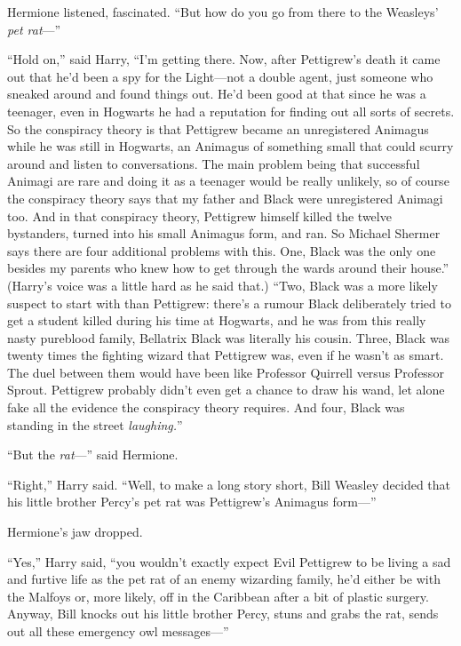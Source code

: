 Hermione listened, fascinated. “But how do you go from there to the Weasleys’ \emph{pet rat}—”

“Hold on,” said Harry, “I’m getting there. Now, after Pettigrew’s death it came out that he’d been a spy for the Light—not a double agent, just someone who sneaked around and found things out. He’d been good at that since he was a teenager, even in Hogwarts he had a reputation for finding out all sorts of secrets. So the conspiracy theory is that Pettigrew became an unregistered Animagus while he was still in Hogwarts, an Animagus of something small that could scurry around and listen to conversations. The main problem being that successful Animagi are rare and doing it as a teenager would be really unlikely, so of course the conspiracy theory says that my father and Black were unregistered Animagi too. And in that conspiracy theory, Pettigrew himself killed the twelve bystanders, turned into his small Animagus form, and ran. So Michael Shermer says there are four additional problems with this. One, Black was the only one besides my parents who knew how to get through the wards around their house.” (Harry’s voice was a little hard as he said that.) “Two, Black was a more likely suspect to start with than Pettigrew: there’s a rumour Black deliberately tried to get a student killed during his time at Hogwarts, and he was from this really nasty pureblood family, Bellatrix Black was literally his cousin. Three, Black was twenty times the fighting wizard that Pettigrew was, even if he wasn’t as smart. The duel between them would have been like Professor Quirrell versus Professor Sprout. Pettigrew probably didn’t even get a chance to draw his wand, let alone fake all the evidence the conspiracy theory requires. And four, Black was standing in the street \emph{laughing.}”

“But the \emph{rat}—” said Hermione.

“Right,” Harry said. “Well, to make a long story short, Bill Weasley decided that his little brother Percy’s pet rat was Pettigrew’s Animagus form—”

Hermione’s jaw dropped.

“Yes,” Harry said, “you wouldn’t exactly expect Evil Pettigrew to be living a sad and furtive life as the pet rat of an enemy wizarding family, he’d either be with the Malfoys or, more likely, off in the Caribbean after a bit of plastic surgery. Anyway, Bill knocks out his little brother Percy, stuns and grabs the rat, sends out all these emergency owl messages—”

